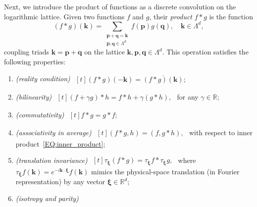 \documentclass[12pt]{article}
\theoremstyle{definition}
\begin{document}
	Next, we introduce the product of functions as a discrete convolution on the logarithmic lattice.
	Given two functions $f$ and $g$, their \textit{product} $f \ast g$ is the function
	\begin{equation}
	(f \ast g)(\mathbf{k}) = \sum_{\substack{\mathbf{p} + \mathbf{q} = \mathbf{k}\\[2pt] \mathbf{p},\mathbf{q} \in \mathbb{\Lambda}^d}} f(\mathbf{p}) g(\mathbf{q}), \quad \mathbf{k} \in \mathbb{\Lambda}^d,
	\label{EQ:convolution}
	\end{equation}
	coupling triads $\mathbf{k} = \mathbf{p} + \mathbf{q}$ on the lattice $\mathbf{k},\mathbf{p},\mathbf{q} \in \mathbb{\Lambda}^d$.
	This operation satisfies the following properties:
	\begin{enumerate}[label=\textit{(P.\arabic*)}] %
		\item \emph{(reality condition)}
		$
		\!
		\begin{aligned}[t]
		(f \ast g)(-\mathbf{k}) = \overline{(f \ast g) (\mathbf{k})};
		\end{aligned}
		$ 
		\label{DEF:PROD_reality}
		\item \emph{(bilinearity)} 
		$
		\!
		\begin{aligned}[t]
		(f + \gamma g) \ast h = f \ast h + \gamma(g \ast h),
		\end{aligned}
		$
		for any $\gamma \in \mathbb{R}$;
		\label{DEF:PROD_bilinearity}
		\item \emph{(commutativity)}
		$
		\!
		\begin{aligned}[t]
		f \ast g = g \ast f;
		\end{aligned}
		$ 
		\label{DEF:PROD_commutativity}
		\item \emph{(associativity in average)}
		$
		\!
		\begin{aligned}[t]
		(f \ast g, h ) = (f, g \ast h),
		\end{aligned}
		$
		with respect to inner product~\eqref{EQ:inner_product};
		\label{DEF:PROD_associativity_avg}
		\item \emph{(translation invariance)}
		$
		\!
		\begin{aligned}[t]
		\tau_{\pmb{\xi}} (f \ast g) = \tau_{\pmb{\xi}} f \ast \tau_{\pmb{\xi}} g,
		\end{aligned}
		$
		where $\tau_{\pmb{\xi}} f (\pmb{k}) = e^{-i\pmb{k} \cdot \pmb{\xi}} f(\pmb{k})$ mimics the physical-space translation (in Fourier representation) by any vector $\pmb{\xi} \in \mathbb{R}^d$;
		\label{DEF:PROD_translation}
		\item \emph{(isotropy and parity)} 

\end{enumerate}
\end{document}
